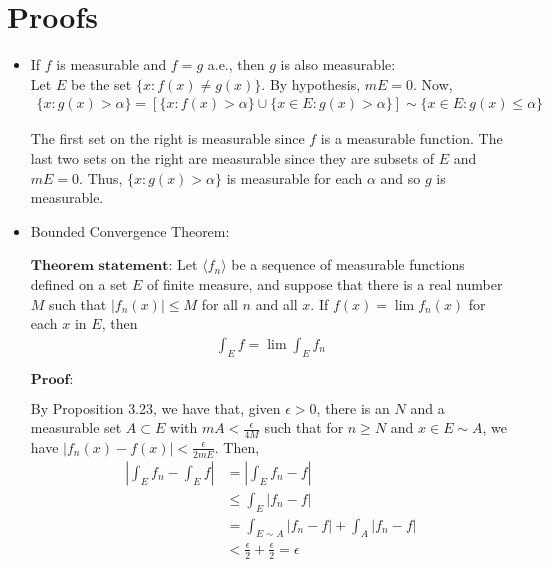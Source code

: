 \documentclass[12pt]{article}
\begin{document}
\newpage
\section{Proofs}

\begin{itemize}

\item If $f$ is measurable and $f = g$ a.e., then $g$ is also measurable:\\

Let $E$ be the set $\{x: f(x) \neq g(x)\}$. By hypothesis, $mE = 0$. Now,
\begin{align*}
\{x: g(x) > \alpha\} = \left[\{x: f(x) > \alpha\} \cup \{x \in E: g(x) > \alpha\}\right] \sim \{x \in E: g(x) \leq \alpha\}
\end{align*}

The first set on the right is measurable since $f$ is a measurable function. The last two sets on the right are measurable since they are subsets of $E$ and $mE = 0$. Thus, $\{x: g(x) > \alpha\}$ is measurable for each $\alpha$ and so $g$ is measurable.
\\
\item Bounded Convergence Theorem:

$\textbf{Theorem statement:}$ Let $\langle f_n \rangle$ be a sequence of measurable functions defined on a set $E$ of finite measure, and suppose that there is a real number $M$ such that $|f_n(x)| \leq M$ for all $n$ and all $x$. If $f(x) = \lim f_n(x)$ for each $x$ in $E$, then
\begin{align*}
\int_E f = \lim \int_E f_n
\end{align*}

$\textbf{Proof:}$

By Proposition 3.23, we have that, given $\epsilon > 0$, there is an $N$ and a measurable set $A \subset E$ with $mA < \frac{\epsilon}{4M}$ such that for $n \geq N$ and $x \in E \sim A$, we have $|f_n(x) - f(x)| < \frac{\epsilon}{2mE}$. Then,
\begin{align*}
\left|\int_E f_n - \int_E f\right| &= \left|\int_E f_n - f\right|\\
&\leq \int_E \left|f_n - f\right|\\
&= \int_{E \sim A} \left|f_n - f\right| + \int_A \left|f_n - f\right|\\
&< \frac{\epsilon}{2} + \frac{\epsilon}{2} = \epsilon
\end{align*}


\end{itemize}
\end{document}

